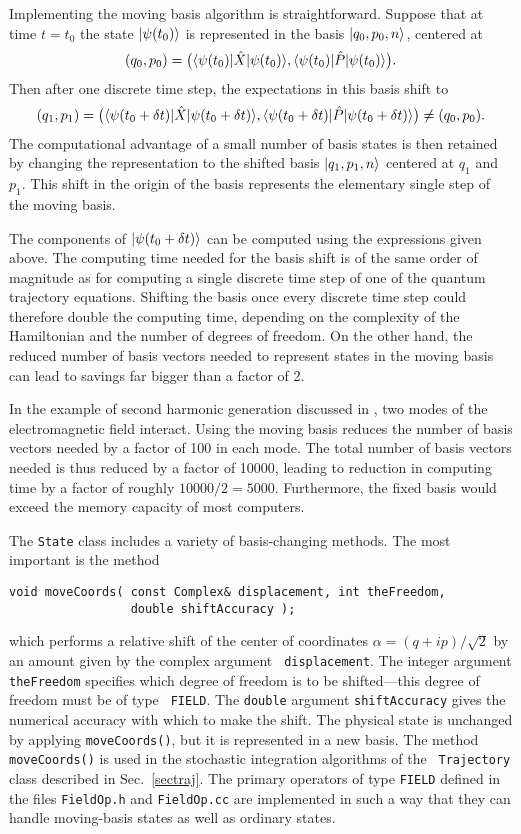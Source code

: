 Implementing the moving basis algorithm is straightforward.  Suppose that at
time $t=t_0$ the state $| \psi(t_0) \rangle$ is represented in the basis
$| q_0,p_0,n \rangle$, centered at
\begin{equation}
(q_0,p_0) = \big(\langle \psi(t_0)|\hat X|\psi(t_0) \rangle,
\langle \psi(t_0)|\hat P|\psi(t_0) \rangle\big).
\end{equation}
Then after one discrete time step, the expectations in this basis shift to 
\begin{equation}
(q_1,p_1) = \big(\langle \psi(t_0+\delta t)|\hat X|\psi(t_0+\delta
t) \rangle, 
\langle \psi(t_0+\delta t)|\hat P|\psi(t_0+\delta t) \rangle\big)\ne
(q_0,p_0).
\end{equation} 
The computational advantage of a small number of basis states is then retained
by changing the representation to the shifted basis $| q_1,p_1,n \rangle$ centered
at $q_1$ and $p_1$.  This shift in the origin of the basis represents the
elementary single step of the moving basis.

The components of $| \psi(t_0+\delta t) \rangle$ can be computed using the
expressions given above. The computing time needed for the basis shift is of
the same order of magnitude as for computing a single discrete time step of one
of the quantum trajectory equations.  Shifting the basis once every discrete
time step could therefore double the computing time, depending on the
complexity of the Hamiltonian and the number of degrees of freedom. On the
other hand, the reduced number of basis vectors needed to represent states in
the moving basis can lead to savings far bigger than a factor of 2.

In the example of second harmonic generation discussed in {\cite{Schack1995c}},
two modes of the electromagnetic field interact. Using the moving basis reduces
the number of basis vectors needed by a factor of 100 in each mode. The total
number of basis vectors needed is thus reduced by a factor of 10000, leading to
reduction in computing time by a factor of roughly $10000/2=5000$. Furthermore,
the fixed basis would exceed the memory capacity of most computers.

The {\tt State} class includes a variety of basis-changing methods. The most
important  is the method
\begin{verbatim}
void moveCoords( const Complex& displacement, int theFreedom,
                 double shiftAccuracy );
\end{verbatim}
which performs a relative shift of the center of coordinates
$\alpha=(q+ip)/\sqrt{2}$ by an amount given by the complex argument {\tt
displacement}. The integer argument {\tt theFreedom} specifies which degree of
freedom is to be shifted---this degree of freedom must be of type {\tt
FIELD}. The {\tt double} argument {\tt shiftAccuracy} gives the numerical
accuracy with which to make the shift. The physical state is unchanged by
applying {\tt moveCoords()}, but it is represented in a new basis. The method
{\tt moveCoords()} is used in the stochastic integration algorithms of the {\tt
Trajectory} class described in Sec.~\ref{sectraj}. The primary operators of
type {\tt FIELD} defined in the files {\tt FieldOp.h} and {\tt FieldOp.cc} are
implemented in such a way that they can handle moving-basis states as well as
ordinary states.

